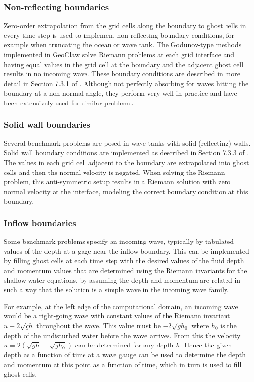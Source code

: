 \subsubsection{Non-reflecting boundaries}\label{sec:bc-outflow}
Zero-order extrapolation from the grid cells along the boundary to ghost
cells in every time step is used to implement non-reflecting boundary
conditions, for example when truncating the ocean or wave tank.  The
Godunov-type methods implemented in GeoClaw solve Riemann problems at each
grid interface and having equal values in the grid cell at the boundary and
the adjacent ghost cell results in no incoming wave.  These boundary
conditions are described in more detail in
Section 7.3.1 of \cite{rjl:fvmhp}.  Although not perfectly absorbing
for waves hitting the boundary at a non-normal angle, they perform
very well in practice and have been extensively used for similar
problems.

\subsubsection{Solid wall boundaries}\label{sec:bc-solid}
Several benchmark problems are posed in wave tanks with solid (reflecting)
walls.  Solid wall
boundary conditions are implemented as described in Section 7.3.3 of
\cite{rjl:fvmhp}.  The values in each grid cell adjacent to the boundary are
extrapolated into ghost cells and then the normal velocity is negated.  When
solving the Riemann problem, this anti-symmetric setup results in a Riemann
solution with zero normal 
velocity at the interface, modeling the correct boundary 
condition at this boundary.

\subsubsection{Inflow boundaries}\label{sec:bc-inflow}
Some benchmark problems specify an incoming wave, typically by tabulated
values of the depth at a gage near the inflow boundary.  
This can be implemented by filling ghost cells at each time step
with the desired values of the fluid depth and momentum values that are
determined using the Riemann invariants for the shallow water equations,
by assuming the depth and momentum are related in such a way that the
solution is a simple wave in the incoming wave family.  

For example, at
the left edge of the computational domain, an incoming wave would be a
right-going wave with constant values of the
Riemann invariant $u - 2\sqrt{gh}$ throughout the wave.
This value must be $-2\sqrt{gh_0}$
where $h_0$ is the depth of the undisturbed water before the wave arrives.
From this the velocity $u = 2(\sqrt{gh} - \sqrt{gh_0})$ can be determined
for any depth $h$.  Hence the given depth as a function of time at a
wave gauge can be used to determine the depth and momentum at this
point as a function of time, which in turn is used to fill ghost
cells.

